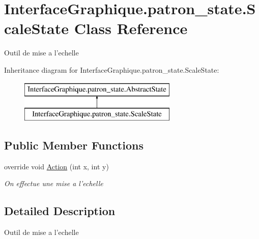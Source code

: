\hypertarget{class_interface_graphique_1_1patron__state_1_1_scale_state}{\section{Interface\-Graphique.\-patron\-\_\-state.\-Scale\-State Class Reference}
\label{class_interface_graphique_1_1patron__state_1_1_scale_state}
}


Outil de mise a l'echelle  


Inheritance diagram for Interface\-Graphique.\-patron\-\_\-state.\-Scale\-State\-:\begin{figure}[H]
\begin{center}
\leavevmode
\includegraphics[height=2.000000cm]{class_interface_graphique_1_1patron__state_1_1_scale_state}
\end{center}
\end{figure}
\subsection*{Public Member Functions}
\begin{DoxyCompactItemize}
\item 
override void \hyperlink{class_interface_graphique_1_1patron__state_1_1_scale_state_af8fe6bca0517beed3c6b9106886d7408}{Action} (int x, int y)
\begin{DoxyCompactList}\small\item\em On effectue une mise a l'echelle \end{DoxyCompactList}\end{DoxyCompactItemize}


\subsection{Detailed Description}
Outil de mise a l'echelle 



